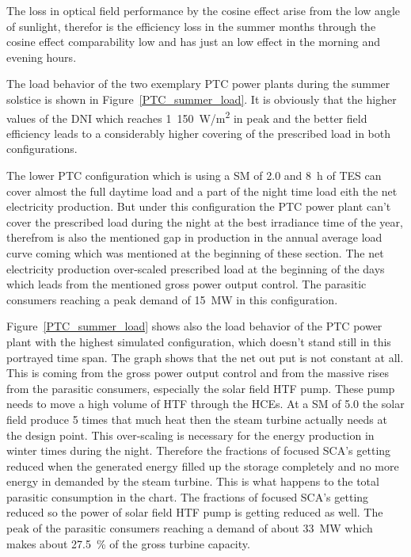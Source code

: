 The loss in optical field performance by the cosine effect arise from the low angle of sunlight, therefor is the efficiency loss in the summer months through the cosine effect comparability low and has just an low effect in the morning and evening hours. 

The load behavior of the two exemplary PTC power plants during the summer solstice is shown in Figure~\ref{PTC_summer_load}. It is obviously that the higher values of the DNI which reaches 1~150~W/m\textsuperscript{2} in peak and the better field efficiency leads to a considerably higher covering of the prescribed load in both configurations. 

The lower PTC configuration which is using a SM of 2.0 and 8~h of TES can cover almost the full daytime load and a part of the night time load eith the net electricity production. But under this configuration the PTC power plant can't cover the prescribed load during the night at the best irradiance time of the year, therefrom is also the mentioned gap in production in the annual average load curve coming which was mentioned at the beginning of these section. The net electricity production over-scaled prescribed load at the beginning of the days which leads from the mentioned gross power output control. The parasitic consumers reaching a peak demand of 15~MW in this configuration. 

Figure~\ref{PTC_summer_load} shows also the load behavior of the PTC power plant with the highest simulated configuration, which doesn't stand still in this portrayed time span. The graph shows that the net out put is not constant at all. This is coming from the gross power output control and from the massive rises from the parasitic consumers, especially the solar field HTF pump. These pump needs to move a high volume of HTF through the HCEs. At a SM of 5.0 the solar field produce 5 times that much heat then the steam turbine actually needs at the design point. This over-scaling is necessary for the energy production in winter times during the night. Therefore the fractions of focused SCA's getting reduced when the generated energy filled up the storage completely and no more energy in demanded by the steam turbine. This is what  happens to the total parasitic consumption in the chart. The fractions of focused SCA's getting reduced so the power of solar field HTF pump is getting reduced as well. The peak of the parasitic consumers reaching a demand of about 33~MW which makes about 27.5~\% of the gross turbine capacity.

